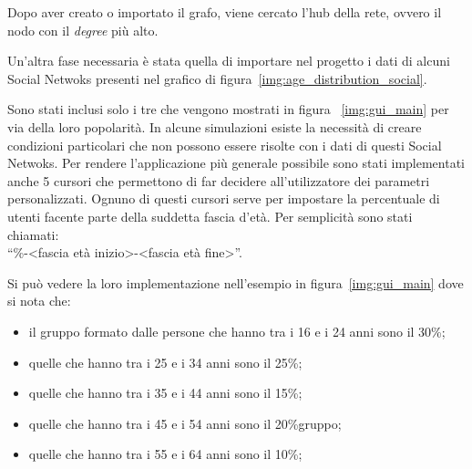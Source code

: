 Dopo aver creato o importato il grafo, viene cercato l'hub della rete, ovvero il nodo con il \emph{degree} più alto.

Un'altra fase necessaria è stata quella di importare nel progetto i dati di alcuni Social Netwoks
presenti nel grafico di figura~\ref{img:age_distribution_social}.


Sono stati inclusi solo i tre che vengono  mostrati in figura ~\ref{img:gui_main} per via della loro popolarità.
In alcune simulazioni esiste la necessità di creare condizioni particolari che non possono essere risolte con i dati 
di questi Social Netwoks.
Per rendere l'applicazione più generale possibile sono stati implementati anche 5 cursori che permettono di far 
decidere all'utilizzatore dei parametri personalizzati.
Ognuno di questi cursori serve per impostare la percentuale di utenti facente parte della suddetta fascia d'età.
Per semplicità sono stati chiamati:\\``\%-<fascia età inizio>-<fascia età fine>''.

Si può vedere la loro implementazione nell'esempio in figura~\ref{img:gui_main} dove si nota che:
\begin{itemize}
 \item il gruppo formato dalle persone che hanno tra i 16 e i 24 anni sono il 30\%;
 \item quelle che hanno tra i 25 e i 34 anni sono il 25\%;
 \item quelle che hanno tra i 35 e i 44 anni sono il 15\%;
 \item quelle che hanno tra i 45 e i 54 anni sono il 20\%gruppo;
 \item quelle che hanno tra i 55 e i 64 anni sono il 10\%;
\end{itemize}

